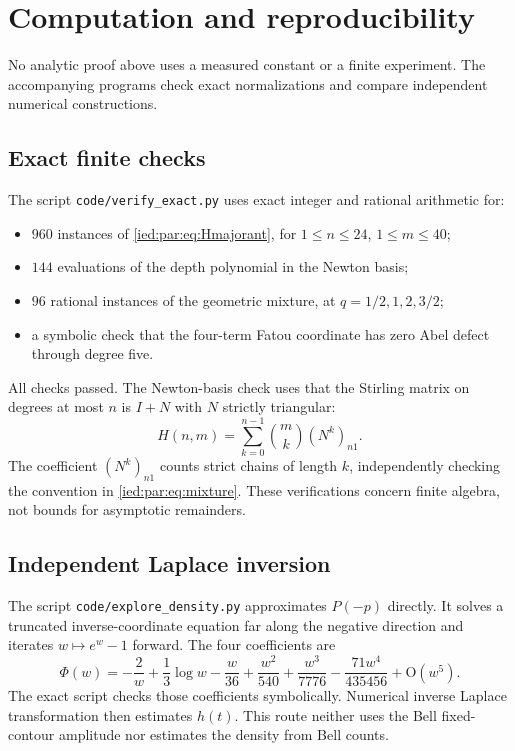 \documentclass[11pt,letterpaper]{article}
\theoremstyle{remark}\newtheorem{remark}[theorem]{Remark}
\newcommand{\Oh}{\mathrm O}\newcommand{\supp}{\operatorname{supp}}
\newcommand{\file}[1]{\nolinkurl{#1}}
\begin{document}
\section{Computation and reproducibility}\label{ied:par:sec:computation}

No analytic proof above uses a measured constant or a finite experiment.
The accompanying programs check exact normalizations and compare
independent numerical constructions.

\subsection{Exact finite checks}
The script \file{code/verify_exact.py} uses exact integer and rational
arithmetic for:
\begin{itemize}[leftmargin=*,itemsep=2pt]
\item $960$ instances of \eqref{ied:par:eq:Hmajorant},
for $1\le n\le24$, $1\le m\le40$;
\item $144$ evaluations of the depth polynomial in the Newton basis;
\item $96$ rational instances of the geometric mixture,
at $q=1/2,1,2,3/2$;
\item a symbolic check that the four-term Fatou coordinate has zero
Abel defect through degree five.
\end{itemize}
All checks passed. The Newton-basis check uses that the Stirling matrix
on degrees at most $n$ is $I+N$ with $N$ strictly triangular:
\[
 H(n,m)=\sum_{k=0}^{n-1}\binom mk(N^k)_{n1}.
\]
The coefficient $(N^k)_{n1}$ counts strict chains of length $k$,
independently checking the convention in \eqref{ied:par:eq:mixture}.
These verifications concern finite algebra, not bounds for asymptotic
remainders.

\subsection{Independent Laplace inversion}
The script \file{code/explore_density.py} approximates $P(-p)$ directly.
It solves a truncated inverse-coordinate equation far along the
negative direction and iterates $w\mapsto e^w-1$ forward.
The four coefficients are
\[
 \Phi(w)=-\frac2w+\frac13\log w-\frac w{36}
 +\frac{w^2}{540}+\frac{w^3}{7776}
 -\frac{71w^4}{435456}+\Oh(w^5).
\]
The exact script checks those coefficients symbolically.
Numerical inverse Laplace transformation then estimates $h(t)$.
This route neither uses the Bell fixed-contour amplitude nor estimates
the density from Bell counts.
\end{document}
